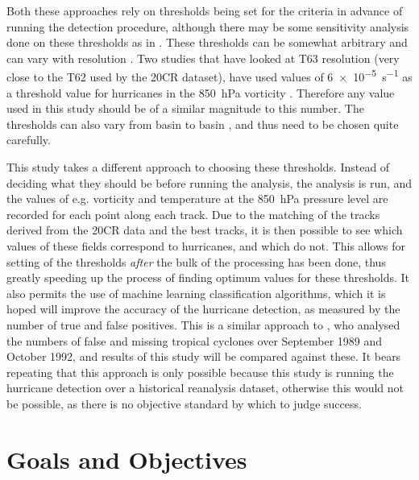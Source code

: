 \documentclass[pdftex,12pt,a4paper]{report}
\begin{document}
Both these approaches rely on thresholds being set for the criteria in advance of running the
detection procedure, although there may be some sensitivity analysis done on these thresholds as in
\textcite{walsh1997objective}. These thresholds can be somewhat arbitrary and can vary with resolution
\parencite{walsh2007objectively}. Two studies that have looked at T63 resolution (very close to the T62 used by
the 20CR dataset), have used values of \SI{6e-5}{s^{-1}} as a threshold value for hurricanes in the
\SI{850}{hPa} vorticity \parencite{bengtsson2006storm, bengtsson2007may}. Therefore any value used in this
study should be of a similar magnitude to this number. The thresholds can also vary from basin to
basin \parencite{camargo2002improving}, and thus need to be chosen quite carefully.

This study takes a different approach to choosing these thresholds. Instead of deciding what they
should be before running the analysis, the analysis is run, and the values of e.g. vorticity and
temperature at the \SI{850}{hPa} pressure level are recorded for each point along each track. Due to
the matching of the tracks derived from the 20CR data and the best tracks, it is then possible to
see which values of these fields correspond to hurricanes, and which do not. This allows for setting
of the thresholds \textit{after} the bulk of the processing has been done, thus greatly speeding up
the process of finding optimum values for these thresholds. It also permits the use of machine
learning classification algorithms, which it is hoped will improve the accuracy of the hurricane
detection, as measured by the number of true and false positives. This is a similar approach to
\textcite{walsh1997objective}, who analysed the numbers of false and missing tropical cyclones over
September 1989 and October 1992, and results of this study will be compared against these. It bears
repeating that this approach is only possible because this study is running the hurricane detection
over a historical reanalysis dataset, otherwise this would not be possible, as there is no objective
standard by which to judge success.

\section{Goals and Objectives}
\end{document}
